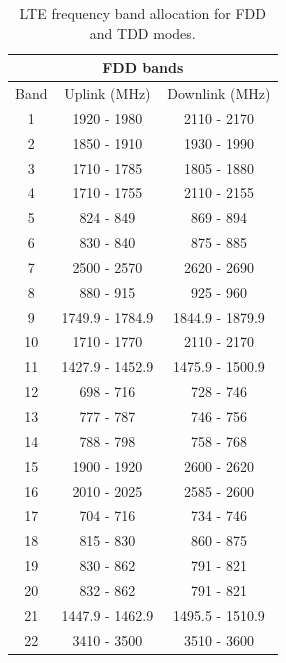 \begin{table}[H]
    \centering
    \caption{LTE frequency band allocation for FDD and TDD modes. \cite{radio_electronics}}
    \label{tab:lte_bands}
    \begin{tabular}{|c|c|c|}
        \hline
        \multicolumn{3}{|c|}{FDD bands} \\
        \hline
         Band & Uplink (MHz) & Downlink (MHz) \\
         \hline
         1 & 1920 - 1980 & 2110 - 2170\\
         \hline
         2 & 1850 - 1910 & 1930 - 1990\\
         \hline
         3 & 1710 - 1785 & 1805 - 1880\\
         \hline
         4 & 1710 - 1755 & 2110 - 2155\\
         \hline
         5 & 824 - 849 & 869 - 894\\
         \hline
         6 & 830 - 840 & 875 - 885\\
         \hline
         7 & 2500 - 2570 & 2620 - 2690\\
         \hline
         8 & 880 - 915 & 925 - 960\\
         \hline
         9 & 1749.9 - 1784.9 & 1844.9 - 1879.9\\
         \hline
         10 & 1710 - 1770 & 2110 - 2170\\
         \hline
         11 & 1427.9 - 1452.9 & 1475.9 - 1500.9\\
         \hline
         12 & 698 - 716 & 728 - 746\\
         \hline
         13 & 777 - 787 & 746 - 756\\
         \hline
         14 & 788 - 798 & 758 - 768\\
         \hline
         15 & 1900 - 1920 & 2600 - 2620\\
         \hline
         16 & 2010 - 2025 & 2585 - 2600\\
         \hline
         17 & 704 - 716 & 734 - 746\\
         \hline
         18 & 815 - 830 & 860 - 875\\
         \hline
         19 & 830 - 862 & 791 - 821\\
         \hline
         20 & 832 - 862 & 791 - 821\\
         \hline
         21 & 1447.9 - 1462.9 & 1495.5 - 1510.9\\
         \hline
         22 &  3410 - 3500 & 3510 - 3600\\
         \hline

\end{tabular}
\end{table}
